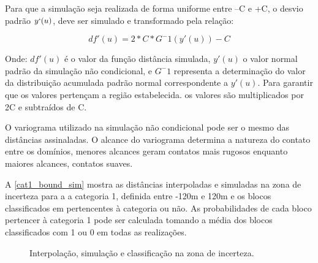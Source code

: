 Para que a simulação seja realizada de forma uniforme entre –C e +C, o desvio padrão $y`(u)$, deve ser simulado e transformado pela relação:

\begin{equation}
    df'(u)=2*C*G^-1(y'(u))-C
\end{equation}

Onde: $df'(u)$ é o valor da função distância simulada, $y'(u)$ o valor normal padrão da simulação não condicional, e $G^-1$ representa a determinação do valor da distribuição acumulada padrão normal correspondente a $y'(u)$. Para garantir que os valores pertençam a região estabelecida. os valores são multiplicados por 2C e subtraídos de C.

O variograma utilizado na simulação não condicional pode ser o mesmo das distâncias assinaladas. O alcance do variograma determina a natureza do contato entre os domínios, menores alcances geram contatos mais rugosos enquanto maiores alcances, contatos suaves.

A \autoref{cat1_bound_sim} mostra as distâncias interpoladas e simuladas na zona de incerteza para a a categoria 1, definida entre -120m e 120m e os blocos classificados em pertencentes à categoria ou não. As probabilidades de cada bloco pertencer à categoria 1 pode ser calculada tomando a média dos blocos classificados com 1 ou 0 em todas as realizações.

\begin{figure}[H] 
    \caption{Interpolação, simulação e classificação na zona de incerteza.} \label{cat1_bound_sim}
     \centering
\end{figure}

